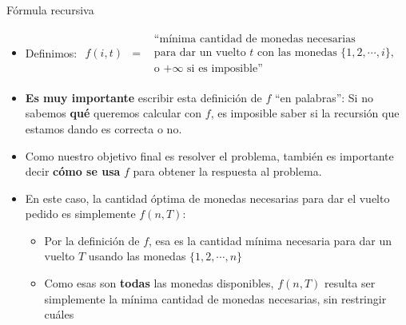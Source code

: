 \documentclass{beamer}
\begin{document}
\begin{frame}{Fórmula recursiva}
\begin{itemize}
    \small
    \item Definimos: $\begin{array}{rcl}f(i, t) & = & \begin{array}{c}\mbox{``mínima cantidad de monedas necesarias} \\ \mbox{para dar un vuelto $t$ con las monedas $\{1, 2, \cdots, i \}$,} \\ \mbox{o $+\infty$ si es imposible''}\end{array}\end{array}$

    \item \textbf{Es muy importante} escribir esta definición de $f$ ``en palabras'': Si no sabemos \textbf{qué} queremos calcular con $f$, es imposible saber si la recursión que estamos dando es correcta o no.
    
    \item Como nuestro objetivo final es resolver el problema, también es importante decir \textbf{cómo se usa} $f$ para obtener la respuesta al problema.
    
    \item En este caso, la cantidad óptima de monedas necesarias para dar el vuelto pedido es simplemente $f(n, T)$:
      \begin{itemize}
         \item Por la definición de $f$, esa es la cantidad mínima necesaria para dar un vuelto $T$ usando las monedas $\{1, 2, \cdots, n \}$
         \item Como esas son \textbf{todas} las monedas disponibles, $f(n,T)$ resulta ser simplemente la mínima cantidad de monedas necesarias, sin restringir cuáles
      \end{itemize}
\end{itemize}    
\end{frame}
\end{document}
